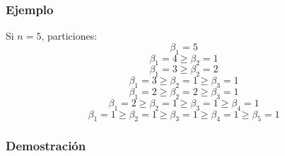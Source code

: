 \documentclass[11pt,a4paper]{article}
\begin{document}
\subsubsection*{Ejemplo}

Si $n = 5$, particiones:
$$\beta_{1} = 5$$
$$\beta_{1} = 4 \geq \beta_{2} = 1$$
$$\beta_{1} = 3 \geq \beta_{2} = 2$$
$$\beta_{1} = 3 \geq \beta_{2} = 1 \geq \beta_{3} = 1$$
$$\beta_{1} = 2 \geq \beta_{2} = 2 \geq \beta_{3} = 1$$
$$\beta_{1} = 2 \geq \beta_{2} = 1 \geq \beta_{3} = 1 \geq \beta_{4} = 1$$
$$\beta_{1} = 1 \geq \beta_{2} = 1 \geq \beta_{3} = 1 \geq \beta_{4} = 1 \geq \beta_{5} = 1$$

\subsubsection*{Demostración}
\end{document}
